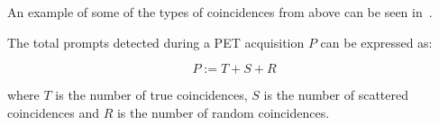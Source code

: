             An example of some of the types of coincidences from above can be seen in~.
            
            The total prompts detected during a \gls{PET} acquisition $P$ can be expressed as:
            
            \begin{equation}
                P := T + S + R
            \end{equation}
            
            \noindent where $T$ is the number of true coincidences, $S$ is the number of scattered coincidences and $R$ is the number of random coincidences. %
            
                    
                    
                
                
